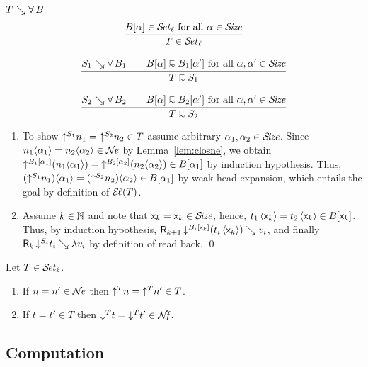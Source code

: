 \documentclass[acmlarge,review,anonymous]{acmart}\settopmatter{printfolios=true}
\makeatletter
\newenvironment{proof*}[1][\proofname]{\par
  \normalfont \topsep6\p@\@plus6\p@\relax
  \trivlist
  \item[\@proofindent\hskip\labelsep
        {\@proofnamefont #1\@addpunct{.}}]\ignorespaces
}{%
  \endtrivlist\@endpefalse
}
\makeatother
\begin{document}
\begin{proof*}
\begin{caselist}
\nextcase $T \evalsto \forallT B$
\begin{gather*}
  \ru{B[\alpha] \in \SET[\ell] \mforall \alpha \in \SIZE
    }{T \in \SET[\ell]}
\\[2ex]
  \ru{S_1 \evalsto \forallT{B_1} \qquad
      B[\alpha] \shape B_1[\alpha'] \mforall \alpha, \alpha' \in \SIZE
    }{T \shape S_1}
\\[2ex]
  \ru{S_2 \evalsto \forallT{B_2} \qquad
      B[\alpha] \shape B_2[\alpha'] \mforall \alpha, \alpha' \in \SIZE
    }{T \shape S_2}
\end{gather*}
\begin{enumerate}
\item To show $\up{S_1}{n_1} = \up{S_2}{n_2} \in T$ assume arbitrary $\alpha_1,\alpha_2 \in \SIZE$.
  Since $n_1 \ann{\alpha_1} = n_2 \ann{\alpha_2} \in \NE$ by Lemma~\ref{lem:closne}, we obtain
  $\up{B_1[\alpha_1]}{(n_1 \ann{\alpha_1})} = \up{B_2[\alpha_2]}{(n_2 \ann{\alpha_2})} \in B[\alpha_1]$
  by induction hypothesis.
  Thus, $(\up{S_1}{n_1}) \ann{\alpha_1} = (\up{S_2}{n_2}) \ann{\alpha_2} \in B[\alpha_1]$
  by weak head expansion, which entails the goal by definition of $\EL(T)$.
\item Assume $k \in \NN$ and note that $\lev k = \lev k \in \SIZE$, hence,
  $t_1\,\ann{\lev k} = t_2\,\ann{\lev k} \in B[\lev k]$.  Thus, by induction hypothesis,
  $\R{k+1}{\down{B_i[\lev k]}(t_i\,\ann{\lev k})}{v_i}$, and finally
  $\R k {\down{S_i} t_i} {\lambda v_i}$ by definition of read back.
\qed
\end{enumerate}

\end{caselist}
\end{proof*}

\begin{corollary}
  \label{cor:rere}
  Let\/ $T \in \SET[\ell]$.
  \begin{enumerate}
  \item If\/ $n = n' \in \NE$ then $\up T n = \up T n' \in T$.
  \item If\/ $t = t' \in T$ then $\down T t = \down T {t'} \in \NF$.
  \end{enumerate}
\end{corollary}


\subsection{Computation}
\label{sec:comp}
\end{document}
